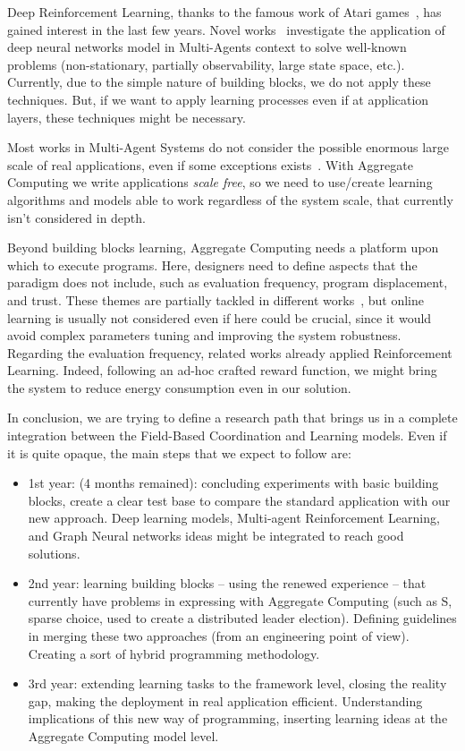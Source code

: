 \documentclass[conference]{IEEEtran}
\begin{document}
Deep Reinforcement Learning, thanks to the famous work of Atari games~\cite{DBLP:journals/corr/HosuR16}, has gained interest in the last few years. Novel works~\cite{DBLP:journals/aamas/Hernandez-LealK19} investigate the application of deep neural networks model in Multi-Agents context
to solve well-known problems (non-stationary, partially observability, large state space, etc.). Currently, due to the simple nature of building blocks, we do not apply these techniques. But, if we want to apply learning processes even if
at application layers, these techniques might be necessary.

Most works in Multi-Agent Systems do not consider the possible enormous large scale of real applications, even if some exceptions exists~\cite{nguyen2018reinforcement}. With Aggregate Computing we write applications \emph{scale free}, so we need to use/create learning algorithms and models able to work
regardless of the system scale, that currently isn't considered in depth.

Beyond building blocks learning, Aggregate Computing needs a platform upon which to execute programs. 
Here, designers need to define aspects that the paradigm does not include, 
such as evaluation frequency, program displacement, and trust. 
These themes are partially tackled in different works~\cite{DBLP:journals/scp/CasadeiAV18, DBLP:journals/fi/CasadeiPPVW20, DBLP:journals/corr/abs-2012-13806}, 
but online learning is usually not considered even if here could be crucial, 
since it would avoid complex parameters tuning and improving the system robustness.
Regarding the evaluation frequency, related works already applied Reinforcement Learning. 
Indeed, following an ad-hoc crafted reward function, we might bring the system to reduce energy consumption even in our solution.

In conclusion, we are trying to define a research path that brings us in a complete integration between the Field-Based Coordination and Learning models. Even if it is quite opaque, the main
steps that we expect to follow are:
\begin{itemize}
    \item 1st year: (4 months remained): concluding experiments with basic building blocks, create a clear test base to compare the standard application with our new approach. Deep learning models, Multi-agent Reinforcement Learning, and Graph Neural networks ideas might be integrated to reach good solutions.
    \item 2nd year: learning building blocks -- using the renewed experience -- that currently have problems in expressing with Aggregate Computing (such as S, sparse choice, used to create a distributed leader election).
    Defining guidelines in merging these two approaches (from an engineering point of view). Creating a sort of hybrid programming methodology.
    \item 3rd year: extending learning tasks to the framework level, closing the reality gap, making the deployment in real application efficient. Understanding implications of this new way of programming, inserting learning ideas at the Aggregate Computing model level. 
\end{itemize}



\end{document}
